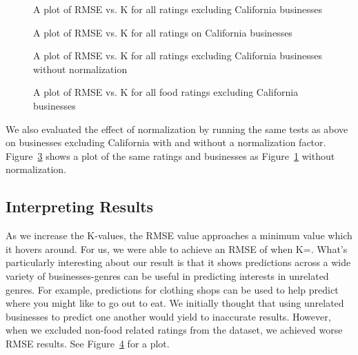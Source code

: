 \begin{figure}[ht!]
	\centering
	\caption[]{A plot of RMSE vs. K for all ratings excluding California businesses}
	\label{fig:nocal}
\end{figure}


\begin{figure}[ht!]
	\centering
	\caption[]{A plot of RMSE vs. K for all ratings on California businesses}
	\label{fig:cal}
\end{figure}

\begin{figure}[ht!]
	\centering
	\caption[]{A plot of RMSE vs. K for all ratings excluding 
California businesses without normalization}
	\label{fig:norm}
\end{figure}

\begin{figure}[ht!]
	\centering
	\caption[]{A plot of RMSE vs. K for all food ratings excluding California businesses}
	\label{fig:foodonly}
\end{figure}

We also evaluated the effect of normalization by running the same tests as
above on businesses excluding California with and without a normalization
factor. Figure~\ref{fig:norm} shows a plot of the same ratings and businesses
as Figure~\ref{fig:nocal} without normalization.

\subsection{Interpreting Results}
As we increase the K-values, the RMSE value approaches a minimum value which it
hovers around. For us, we were able to achieve an RMSE of \bestRMSE when
K=\bestK.
What's particularly interesting about our result is that it shows predictions
across a wide variety of businesses-genres can be useful in predicting
interests in unrelated genres. For example, predictions for clothing shops can
be used to help predict where you might like to go out to eat. We initially
thought that using unrelated businesses to predict one another would yield to
inaccurate results. However, when we excluded non-food related ratings from the
dataset, we achieved worse RMSE results. See Figure~\ref{fig:foodonly} for a
plot.

